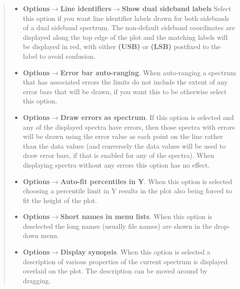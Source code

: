 \documentclass[twoside,11pt]{article}
\newcommand{\latexhtml}[2]{#1}
\renewcommand{\_}{\texttt{\symbol{95}}}
\newcommand{\submenuitem}[2]{\latexhtml{\textbf{#1$\rightarrow$#2}}{\textbf{#1->#2}}}
\newcommand{\subsubmenuitem}[3]{\latexhtml{\textbf{#1$\rightarrow$#2$\rightarrow$#3}}{\textbf{#1->#2->#3}}}
\newcommand{\labelitem}[1]{\textbf{#1}}
\begin{document}
\begin{quote}
\begin{itemize}
  \item \subsubmenuitem{Options}{Line identifiers}{Show dual sideband labels}
  Select this option if you want line identifier labels drawn for both
  sidebands of a dual sideband spectrum. The non-default sideband coordinates
  are displayed along the top edge of the plot and the matching labels
  will be displayed in red, with either \labelitem{(USB)} or
  \labelitem{(LSB)} postfixed to the label to avoid confusion.

  \item \submenuitem{Options}{Error bar auto-ranging}. When auto-ranging a
  spectrum that has associated errors the limits do not include the extent of
  any error bars that will be drawn, if you want this to be otherwise select
  this option.

  \item \submenuitem{Options}{Draw errors as spectrum}. If this option is
  selected and any of the displayed spectra have errors, then those spectra
  with errors will be drawn using the error value as each point on the line
  rather than the data values (and conversely the data values will be used to
  draw error bars, if that is enabled for any of the spectra). When displaying
  spectra without any errors this option has no effect.

  \item \submenuitem{Options}{Auto-fit percentiles in Y}. When this option is
  selected choosing a percentile limit in Y results in the plot also being
  forced to fit the height of the plot.

  \item \submenuitem{Options}{Short names in menu lists}. When this option is
  deselected the long names (usually file names) are shown in the
  \label{Displaying:} drop-down menu.

  \item \submenuitem{Options}{Display synopsis}. When this option is selected
  a description of various properties of the current spectrum is displayed
  overlaid on the plot. The description can be moved around by dragging.


\end{itemize}
\end{quote}
\end{document}
